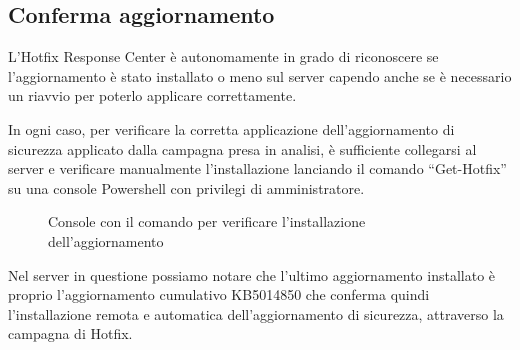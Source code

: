 \subsection{Conferma aggiornamento}
L’Hotfix Response Center è autonomamente in grado di riconoscere se 
l'aggiornamento è stato installato o meno sul server capendo anche se è 
necessario un riavvio per poterlo applicare correttamente.

In ogni caso, per verificare la corretta applicazione dell'aggiornamento di 
sicurezza applicato dalla campagna presa in analisi, è sufficiente collegarsi al 
server e verificare manualmente l’installazione lanciando il comando “Get-Hotfix” 
su una console Powershell con privilegi di amministratore.

\begin{figure}[H]
\begin{flushright}
    \centering
    \caption{Console con il comando per verificare l'installazione dell'aggiornamento}
    \label{fig:Console con il comando per verificare l'installazione dell'aggiornamento}
\end{flushright}
\end{figure}

Nel server in questione possiamo notare che l'ultimo aggiornamento installato è
proprio l'aggiornamento cumulativo KB5014850 che conferma quindi l'installazione
remota e automatica dell'aggiornamento di sicurezza, attraverso la campagna di Hotfix.
